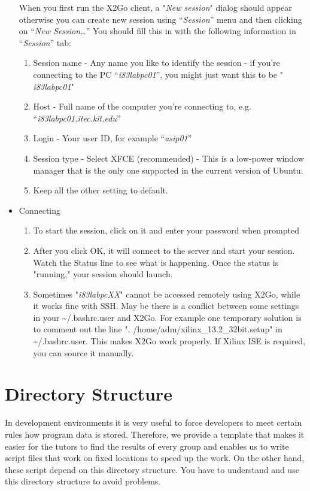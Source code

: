 \begin{itemize}
When you first run the X2Go client, a "\emph{New session}" dialog should
appear otherwise you can create new session using ``\emph{Session}''
menu and then clicking on ``\emph{New Session\ldots{}}'' You should fill
this in with the following information in ``\emph{Session}'' tab:
\begin{enumerate}
\def\labelenumi{\alph{enumi}.}
\item
  Session name - Any name you like to identify the session - if you're
  connecting to the PC ``\emph{i83labpc01}'', you might just want this
  to be " \emph{i83labpc01}"
\item
  Host - Full name of the computer you're connecting to, e.g.
  ``\emph{i83labpc01.itec.kit.edu}''
\item
  Login - Your user ID, for example ``\emph{asip01}''
\item
  Session type - Select XFCE (recommended) - This is a low-power window
  manager that is the only one supported in the current version of
  Ubuntu.
\item
  Keep all the other setting to default.
\end{enumerate}
\item
  Connecting
  \begin{enumerate}
  \def\labelenumi{\alph{enumi}.}
  \item
    To start the session, click on it and enter your password when
    prompted
  \item
    After you click OK, it will connect to the server and start your
    session. Watch the Status line to see what is happening. Once the
    status is "running," your session should launch.
  \item
    Sometimes "\emph{i83labpcXX}" cannot be accessed remotely using
    X2Go, while it works fine with SSH. May be there is a conflict
    between some settings in your \textasciitilde/.bashrc.user and X2Go.
    For example one temporary solution is to comment out the line ".
    /home/adm/xilinx\_13.2\_32bit.setup" in
    \textasciitilde/.bashrc.user. This makes X2Go work properly. If
    Xilinx ISE is required, you can source it manually.
  \end{enumerate}
\end{itemize}
\hypertarget{directory-structure}{%
\section{Directory Structure}\label{directory-structure}}
In development environments it is very useful to force developers to
meet certain rules how program data is stored. Therefore, we provide a
template that makes it easier for the tutors to find the results of
every group and enables us to write script files that work on fixed
locations to speed up the work. On the other hand, these script depend
on this directory structure. You have to understand and use this
directory structure to avoid problems.

